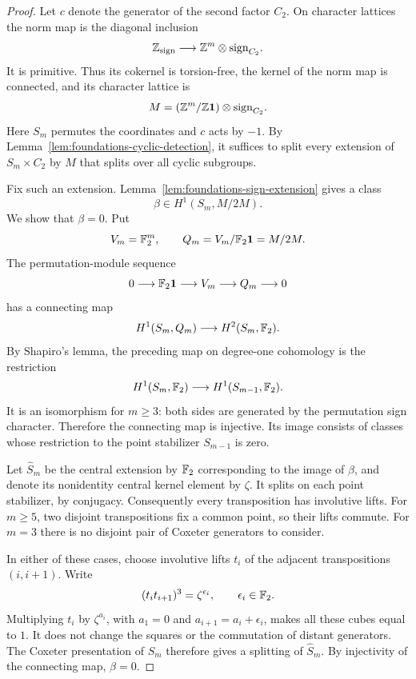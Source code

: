 \begin{proof}
Let \(c\) denote the generator of the second factor \(C_2\).
On character lattices the norm map is the diagonal inclusion
\[
 \mathbb Z_{\mathrm{sign}}\longrightarrow
               \mathbb Z^m\otimes\mathrm{sign}_{C_2}.
\]
It is primitive.  Thus its cokernel is torsion-free, the kernel
of the norm map is connected, and its character lattice is
\begin{equation}\label{eq:foundations-norm-lattice}
       M=(\mathbb Z^m/\mathbb Z\mathbf1)\otimes\mathrm{sign}_{C_2}.
\end{equation}
Here \(S_m\) permutes the coordinates and \(c\) acts by \(-1\).
By Lemma~\ref{lem:foundations-cyclic-detection}, it suffices to split
every extension of \(S_m\times C_2\) by \(M\) that splits over
all cyclic subgroups.

Fix such an extension.  Lemma~\ref{lem:foundations-sign-extension}
gives a class
\[
                 \beta\in H^1(S_m,M/2M).
\]
We show that \(\beta=0\).  Put
\[
       V_m=\mathbb F_2^m,\qquad Q_m=V_m/\mathbb F_2\mathbf1=M/2M .
\]
The permutation-module sequence
\[
 0\longrightarrow\mathbb F_2\mathbf1
   \longrightarrow V_m\longrightarrow Q_m\longrightarrow0
\]
has a connecting map
\[
 H^1(S_m,Q_m)\longrightarrow H^2(S_m,\mathbb F_2).
\]
By Shapiro's lemma, the preceding map on degree-one cohomology
is the restriction
\[
 H^1(S_m,\mathbb F_2)\longrightarrow H^1(S_{m-1},\mathbb F_2).
\]
It is an isomorphism for \(m\geq3\): both sides are generated by
the permutation sign character.  Therefore the connecting map
is injective.  Its image consists of classes whose restriction to
the point stabilizer \(S_{m-1}\) is zero.

Let \(\widehat S_m\) be the central extension by \(\mathbb F_2\)
corresponding to the image of \(\beta\), and denote its nonidentity
central kernel element by \(\zeta\).  It splits on each point
stabilizer, by conjugacy.  Consequently every transposition has
involutive lifts.  For \(m\geq5\), two disjoint transpositions fix
a common point, so their lifts commute.  For \(m=3\) there is no
disjoint pair of Coxeter generators to consider.

In either of these cases, choose involutive lifts \(t_i\) of
the adjacent transpositions \((i,i+1)\).
Write
\[
                 (t_it_{i+1})^3=\zeta^{\epsilon_i},
                       \qquad \epsilon_i\in\mathbb F_2 .
\]
Multiplying \(t_i\) by \(\zeta^{a_i}\), with
\(a_1=0\) and \(a_{i+1}=a_i+\epsilon_i\), makes all these cubes
equal to \(1\).  It does not change the squares or the commutation
of distant generators.  The Coxeter presentation of \(S_m\)
therefore gives a splitting of \(\widehat S_m\).
By injectivity of the connecting map, \(\beta=0\).


\end{proof}
